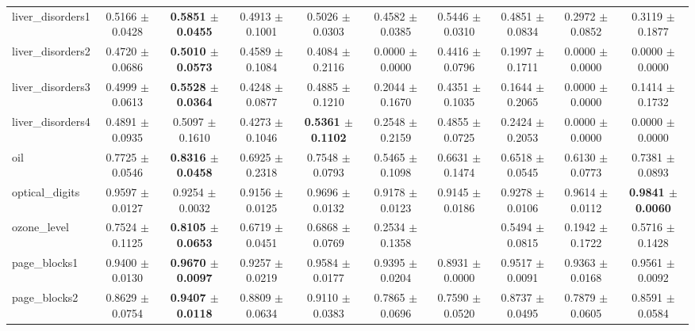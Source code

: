\begin{table*}[htbp]
{\begin{tabular}{lccccccccc}
            liver\_disorders1 & 0.5166 $\pm$ 0.0428 & \cellcolor{graybg}\textbf{0.5851 $\pm$ 0.0455} & 0.4913 $\pm$ 0.1001 & 0.5026 $\pm$ 0.0303 & 0.4582 $\pm$ 0.0385 & 0.5446 $\pm$ 0.0310 & 0.4851 $\pm$ 0.0834 & 0.2972 $\pm$ 0.0852 & 0.3119 $\pm$ 0.1877 \\ 
            liver\_disorders2 & 0.4720 $\pm$ 0.0686 & \cellcolor{graybg}\textbf{0.5010 $\pm$ 0.0573} & 0.4589 $\pm$ 0.1084 & 0.4084 $\pm$ 0.2116 & 0.0000 $\pm$ 0.0000 & 0.4416 $\pm$ 0.0796 & 0.1997 $\pm$ 0.1711 & 0.0000 $\pm$ 0.0000 & 0.0000 $\pm$ 0.0000 \\ 
            liver\_disorders3 & 0.4999 $\pm$ 0.0613 & \cellcolor{graybg}\textbf{0.5528 $\pm$ 0.0364} & 0.4248 $\pm$ 0.0877 & 0.4885 $\pm$ 0.1210 & 0.2044 $\pm$ 0.1670 & 0.4351 $\pm$ 0.1035 & 0.1644 $\pm$ 0.2065 & 0.0000 $\pm$ 0.0000 & 0.1414 $\pm$ 0.1732 \\ 
            liver\_disorders4 & 0.4891 $\pm$ 0.0935 & 0.5097 $\pm$ 0.1610 & 0.4273 $\pm$ 0.1046 & \cellcolor{graybg}\textbf{0.5361 $\pm$ 0.1102} & 0.2548 $\pm$ 0.2159 & 0.4855 $\pm$ 0.0725 & 0.2424 $\pm$ 0.2053 & 0.0000 $\pm$ 0.0000 & 0.0000 $\pm$ 0.0000 \\ 
            oil & 0.7725 $\pm$ 0.0546 & \cellcolor{graybg}\textbf{0.8316 $\pm$ 0.0458} & 0.6925 $\pm$ 0.2318 & 0.7548 $\pm$ 0.0793 & 0.5465 $\pm$ 0.1098 & 0.6631 $\pm$ 0.1474 & 0.6518 $\pm$ 0.0545 & 0.6130 $\pm$ 0.0773 & 0.7381 $\pm$ 0.0893 \\ 
            optical\_digits & 0.9597 $\pm$ 0.0127 & 0.9254 $\pm$ 0.0032 & 0.9156 $\pm$ 0.0125 & 0.9696 $\pm$ 0.0132 & 0.9178 $\pm$ 0.0123 & 0.9145 $\pm$ 0.0186 & 0.9278 $\pm$ 0.0106 & 0.9614 $\pm$ 0.0112 & \cellcolor{graybg}\textbf{0.9841 $\pm$ 0.0060} \\ 
            ozone\_level & 0.7524 $\pm$ 0.1125 & \cellcolor{graybg}\textbf{0.8105 $\pm$ 0.0653} & 0.6719 $\pm$ 0.0451 & 0.6868 $\pm$ 0.0769 & 0.2534 $\pm$ 0.1358 &  & 0.5494 $\pm$ 0.0815 & 0.1942 $\pm$ 0.1722 & 0.5716 $\pm$ 0.1428 \\ 
            page\_blocks1 & 0.9400 $\pm$ 0.0130 & \cellcolor{graybg}\textbf{0.9670 $\pm$ 0.0097} & 0.9257 $\pm$ 0.0219 & 0.9584 $\pm$ 0.0177 & 0.9395 $\pm$ 0.0204 & 0.8931 $\pm$ 0.0000 & 0.9517 $\pm$ 0.0091 & 0.9363 $\pm$ 0.0168 & 0.9561 $\pm$ 0.0092 \\ 
            page\_blocks2 & 0.8629 $\pm$ 0.0754 & \cellcolor{graybg}\textbf{0.9407 $\pm$ 0.0118} & 0.8809 $\pm$ 0.0634 & 0.9110 $\pm$ 0.0383 & 0.7865 $\pm$ 0.0696 & 0.7590 $\pm$ 0.0520 & 0.8737 $\pm$ 0.0495 & 0.7879 $\pm$ 0.0605 & 0.8591 $\pm$ 0.0584 \\ 

\end{tabular}}
\end{table*}
